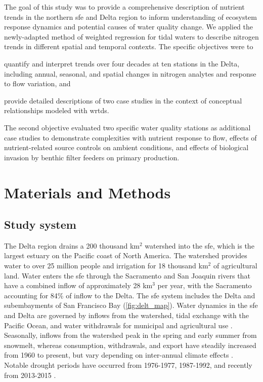 \documentclass[letterpaper,12pt,oneside]{article}\usepackage[]{graphicx}\usepackage[]{color}
\begin{document}
The goal of this study was to provide a comprehensive description of nutrient trends in the northern \ac{sfe} and Delta region to inform understanding of ecosystem response dynamics and potential causes of water quality change. We applied the newly-adapted method of weighted regression for tidal waters to describe nitrogen trends in  different spatial and temporal contexts. The specific objectives were to \begin{inparaenum}[1\upshape)]  
\item quantify and interpret trends over four decades at ten stations in the Delta, including annual, seasonal, and spatial changes in nitrogen analytes and response to flow variation, and
\item provide detailed descriptions of two case studies in the context of conceptual relationships modeled with \ac{wrtds}.
\end{inparaenum}
The second objective evaluated two specific water quality stations as additional case studies to demonstrate complexities with nutrient response to flow, effects of nutrient-related source controls on ambient conditions, and effects of biological invasion by benthic filter feeders on primary production.

\section{Materials and Methods}

\subsection{Study system}

The Delta region drains a 200 thousand km$^2$ watershed into the \ac{sfe}, which is the largest estuary on the Pacific coast of North America.  The watershed provides water to over 25 million people and irrigation for 18 thousand km$^2$ of agricultural land.  Water enters the \ac{sfe} through the Sacramento and San Joaquin rivers that have a combined inflow of approximately 28 km$^3$ per year, with the Sacramento accounting for 84\% of inflow to the Delta.  The \ac{sfe} system includes the Delta and subembayments of San Francisco Bay (\cref{fig:delt_map}).  Water dynamics in the \ac{sfe} and Delta are governed by inflows from the watershed, tidal exchange with the Pacific Ocean, and water withdrawals for municipal and agricultural use \cite{Jassby00}.  Seasonally, inflows from the watershed peak in the spring and early summer from snowmelt, whereas consumption, withdrawals, and export have steadily increased from 1960 to present, but vary depending on inter-annual climate effects \cite{Cloern12b}. Notable drought periods have occurred from 1976-1977, 1987-1992, and recently from 2013-2015 \cite{Cloern15}.
\end{document}
